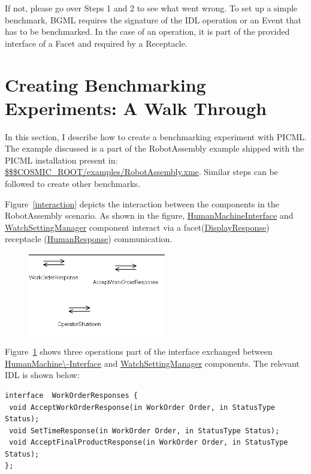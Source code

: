 \documentclass[onecolumn]{article}
\begin{document}
If not, please go over Steps 1 and 2 to see what went wrong.  To set
up a simple benchmark, BGML requires the signature of the IDL
operation or an Event that has to be benchmarked. In the case of an
operation, it is part of the provided interface of a Facet and
required by a Receptacle.

\section* {Creating Benchmarking Experiments: A Walk Through}
In this section, I describe how to create a benchmarking experiment
with PICML. The example discussed is a part of the RobotAssembly
example shipped with the PICML installation present in:
\url{$\$$COSMIC_ROOT/examples/RobotAssembly.xme}. Similar steps can be
followed to create other benchmarks.

Figure~\ref{interaction} depicts the interaction between the
components in the RobotAssembly scenario. As shown in the figure,
\url{HumanMachineInterface} and \url{WatchSettingManager} component
interact via a facet(\url{DisplayResponse}) receptacle
(\url{HumanResponse}) communication.

\begin{figure}[ht]
{
  \includegraphics[width=6cm]{RobotAssembly-Operations.png}
    \label{operations}
}
\end{figure}
Figure~\ref{operations} shows three operations part of the interface
exchanged between \url{HumanMachine\-Interface} and
\url{WatchSettingManager} components. The relevant IDL is shown below:
{
\small
{}
\begin{verbatim}
interface  WorkOrderResponses {
 void AcceptWorkOrderResponse(in WorkOrder Order, in StatusType Status);
 void SetTimeResponse(in WorkOrder Order, in StatusType Status);
 void AcceptFinalProductResponse(in WorkOrder Order, in StatusType Status);
};
\end{verbatim}
}
\normalsize
\end{document}
